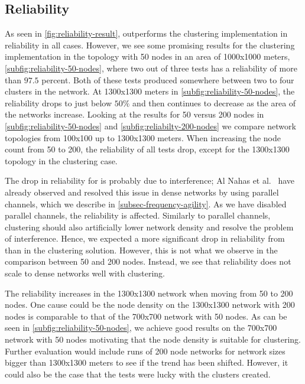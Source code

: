 \subsection{Reliability}
\label{subsec:evaluation-reliability}
As seen in \cref{fig:reliability-result}, \atwo{} outperforms the clustering implementation in reliability in all cases. However, we see some promising results for the clustering implementation in the topology with 50 nodes in an area of 1000x1000 meters, \cref{subfig:reliability-50-nodes}, where two out of three tests has a reliability of more than $97.5$ percent. Both of these tests produced somewhere between two to four clusters in the network. At 1300x1300 meters in \cref{subfig:reliability-50-nodes}, the reliability drops to just below $50\%$ and then continues to decrease as the area of the networks increase. Looking at the results for 50 versus 200 nodes in \cref{subfig:reliability-50-nodes} and \cref{subfig:reliabilty-200-nodes} we compare network topologies from 100x100 up to 1300x1300 meters. When increasing the node count from 50 to 200, the reliability of all tests drop, except for the 1300x1300 topology in the clustering case.


The drop in reliability for \atwo{} is probably due to interference; Al Nahas et al.~\cite{a2-introduction-paper} have already observed and resolved this issue in dense networks by using parallel channels, which we describe in \cref{subsec-frequency-agility}. As we have disabled parallel channels, the reliability is affected. Similarly to parallel channels, clustering should also artificially lower network density and resolve the problem of interference. Hence, we expected a more significant drop in reliability from \atwo{} than in the clustering solution. However, this is not what we observe in the comparison between 50 and 200 nodes. Instead, we see that reliability does not scale to dense networks well with clustering. 

The reliability increases in the 1300x1300 network when moving from 50 to 200 nodes. One cause could be the node density on the 1300x1300 network with 200 nodes is comparable to that of the 700x700 network with 50 nodes. As can be seen in \cref{subfig:reliability-50-nodes}, we achieve good results on the 700x700 network with 50 nodes motivating that the node density is suitable for clustering. Further evaluation would include runs of 200 node networks for network sizes bigger than 1300x1300 meters to see if the trend has been shifted. However, it could also be the case that the tests were lucky with the clusters created.

